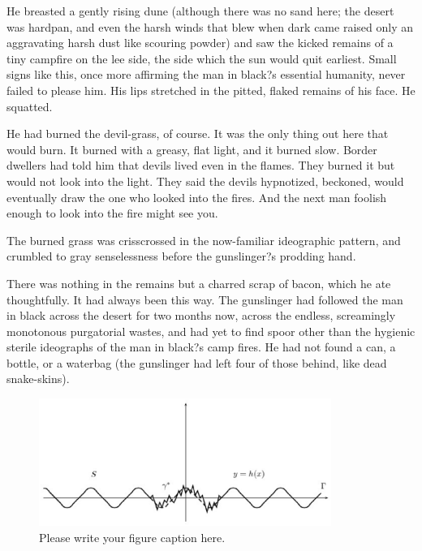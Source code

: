 \documentclass[
11pt,%
tightenlines,%
twoside,%
onecolumn,%
nofloats,%
nobibnotes,%
nofootinbib,%
superscriptaddress,%
noshowpacs,%
centertags]%
{revtex4}
\begin{document}
He breasted a gently rising dune (although there was no sand here; the desert was hardpan, and even the harsh winds that blew when dark came raised only an aggravating harsh dust like scouring powder) and saw the kicked remains of a tiny campfire on the lee side, the side which the sun would quit earliest. Small signs like this, once more affirming the man in black?s essential humanity, never failed to please him. His lips stretched in the pitted, flaked remains of his face. He squatted.

He had burned the devil-grass, of course. It was the only thing out here that would burn. It burned with a greasy, flat light, and it burned slow. Border dwellers had told him that devils lived even in the flames. They burned it but would not look into the light. They said the devils hypnotized, beckoned, would eventually draw the one who looked into the fires. And the next man foolish enough to look into the fire might see you.

The burned grass was crisscrossed in the now-familiar ideographic pattern, and crumbled to gray senselessness before the gunslinger?s prodding hand. 

There was nothing in the remains but a charred scrap of bacon, which he ate thoughtfully. It had always been this way. The gunslinger had followed the man in black across the desert for two months now, across the endless, screamingly monotonous purgatorial wastes, and had yet to find spoor other than the hygienic sterile ideographs of the man in black?s camp fires. He had not found a can, a bottle, or a waterbag (the gunslinger had left four of those behind, like dead snake-skins).

\begin{figure}[h]
\setcaptionmargin{5mm}
\onelinecaptionstrue  %
\includegraphics[width=0.85\textwidth]{deform.eps}
\caption{Please write your figure caption here.}\label{fig:1}
\end{figure}
\end{document}
